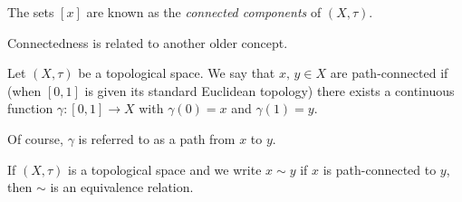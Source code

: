 The sets $[x]$ are known as the \emph{connected components} of $(X,\tau)$.

Connectedness is related to  another older concept.

\begin{definition}\label{D;path-connected}
Let $(X,\tau)$ be a topological space.
We say that $x,\,y\in X$ are path-connected if
(when $[0,1]$ is given its standard Euclidean topology)
there exists a continuous
function $\gamma:[0,1]\rightarrow X$ with
$\gamma(0)=x$ and $\gamma(1)=y$.
\end{definition}

Of course, $\gamma$ is referred to as a path from $x$ to $y$.


\begin{lemma}\label{L;path-connected equivalence}
If $(X,\tau)$ is a topological space and
we write $x\sim y$ if $x$ is path-connected
to $y$, then $\sim$ is an equivalence relation.
\end{lemma}
